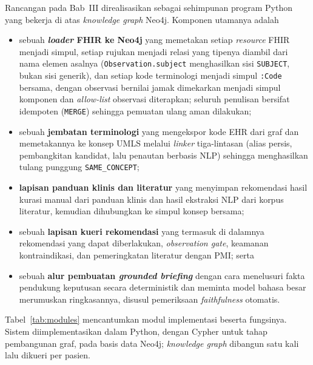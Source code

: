 Rancangan pada Bab~III direalisasikan sebagai sehimpunan program Python yang bekerja di atas
\emph{knowledge graph} Neo4j. Komponen utamanya adalah

\begin{itemize}
    \item sebuah \textbf{\emph{loader} FHIR ke Neo4j} yang memetakan setiap \emph{resource}
    FHIR menjadi simpul, setiap rujukan menjadi relasi yang tipenya diambil dari nama elemen
    asalnya (\texttt{Observation.subject} menghasilkan sisi \texttt{SUBJECT}, bukan sisi
    generik), dan setiap kode terminologi
    menjadi simpul \texttt{:Code} bersama, dengan observasi bernilai jamak dimekarkan menjadi
    simpul komponen dan \emph{allow-list} observasi diterapkan; seluruh penulisan bersifat idempoten
    (\texttt{MERGE}) sehingga pemuatan ulang aman dilakukan;
    \item sebuah \textbf{jembatan terminologi} yang mengekspor kode EHR dari graf dan
    memetakannya ke konsep UMLS melalui \emph{linker} tiga-lintasan (alias persis,
    pembangkitan kandidat, lalu penautan berbasis NLP) sehingga menghasilkan tulang
    punggung \texttt{SAME\_CONCEPT};
    \item \textbf{lapisan panduan klinis dan literatur} yang menyimpan rekomendasi hasil kurasi manual dari panduan klinis dan
    hasil ekstraksi NLP dari korpus literatur, kemudian dihubungkan ke simpul konsep bersama;
    \item sebuah \textbf{lapisan kueri rekomendasi} yang termasuk di dalamnya rekomendasi yang dapat diberlakukan,
    \emph{observation gate}, keamanan kontraindikasi, dan pemeringkatan literatur dengan PMI; serta
    \item sebuah \textbf{alur pembuatan \emph{grounded briefing}} dengan cara menelusuri fakta pendukung
    keputusan secara deterministik dan meminta model bahasa besar merumuskan ringkasannya, disusul
    pemeriksaan \emph{faithfulness} otomatis.
\end{itemize}

Tabel~\ref{tab:modules} mencantumkan modul implementasi beserta fungsinya. Sistem
diimplementasikan dalam Python, dengan Cypher untuk tahap pembangunan graf, pada basis data
Neo4j; \emph{knowledge graph} dibangun satu kali lalu dikueri per pasien.

